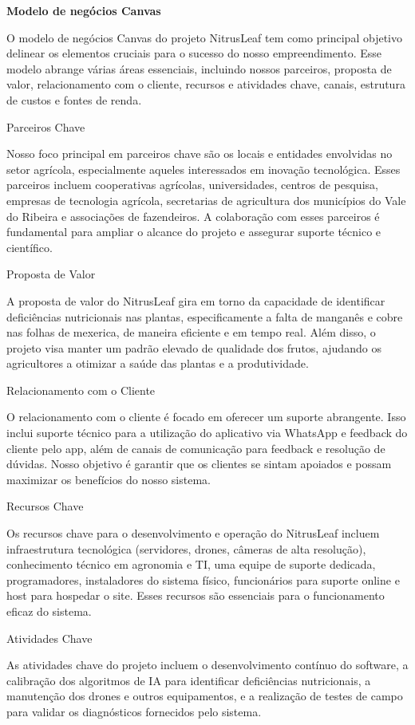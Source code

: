 \textbf{Modelo de negócios Canvas}

O modelo de negócios Canvas do projeto NitrusLeaf  tem como principal objetivo delinear os elementos cruciais para o sucesso do nosso empreendimento. Esse modelo abrange várias áreas essenciais, incluindo nossos parceiros, proposta de valor, relacionamento com o cliente, recursos e atividades chave, canais, estrutura de custos e fontes de renda.

Parceiros Chave

Nosso foco principal em parceiros chave são os locais e entidades envolvidas no setor agrícola, especialmente aqueles interessados em inovação tecnológica. Esses parceiros incluem cooperativas agrícolas, universidades, centros de pesquisa, empresas de tecnologia agrícola, secretarias de agricultura dos municípios do Vale do Ribeira e associações de fazendeiros. A colaboração com esses parceiros é fundamental para ampliar o alcance do projeto e assegurar suporte técnico e científico.

Proposta de Valor

A proposta de valor do NitrusLeaf gira em torno da capacidade de identificar deficiências nutricionais nas plantas, especificamente a falta de manganês e cobre nas folhas de mexerica, de maneira eficiente e em tempo real. Além disso, o projeto visa manter um padrão elevado de qualidade dos frutos, ajudando os agricultores a otimizar a saúde das plantas e a produtividade.

Relacionamento com o Cliente

O relacionamento com o cliente é focado em oferecer um suporte abrangente. Isso inclui suporte técnico para a utilização do aplicativo via WhatsApp e feedback do cliente pelo app, além de canais de comunicação para feedback e resolução de dúvidas. Nosso objetivo é garantir que os clientes se sintam apoiados e possam maximizar os benefícios do nosso sistema.

Recursos Chave

Os recursos chave para o desenvolvimento e operação do NitrusLeaf incluem infraestrutura tecnológica (servidores, drones, câmeras de alta resolução), conhecimento técnico em agronomia e TI, uma equipe de suporte dedicada, programadores, instaladores do sistema físico, funcionários para suporte online e host para hospedar o site. Esses recursos são essenciais para o funcionamento eficaz do sistema.

Atividades Chave

As atividades chave do projeto incluem o desenvolvimento contínuo do software, a calibração dos algoritmos de IA para identificar deficiências nutricionais, a manutenção dos drones e outros equipamentos, e a realização de testes de campo para validar os diagnósticos fornecidos pelo sistema.

